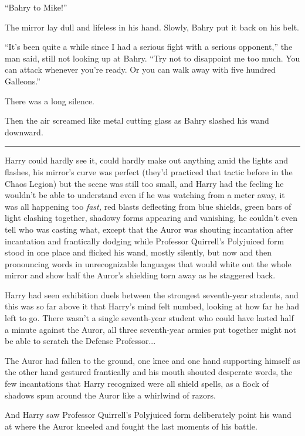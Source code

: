 ``Bahry to Mike!''

The mirror lay dull and lifeless in his hand. Slowly, Bahry put it back
on his belt.

``It's been quite a while since I had a serious fight with a serious
opponent,'' the man said, still not looking up at Bahry. ``Try not to
disappoint me too much. You can attack whenever you're ready. Or you can
walk away with five hundred Galleons.''

There was a long silence.

Then the air screamed like metal cutting glass as Bahry slashed his wand
downward.

\begin{center}\rule{3in}{0.4pt}\end{center}

Harry could hardly see it, could hardly make out anything amid the
lights and flashes, his mirror's curve was perfect (they'd practiced
that tactic before in the Chaos Legion) but the scene was still too
small, and Harry had the feeling he wouldn't be able to understand even
if he was watching from a meter away, it was all happening too
\emph{fast,} red blasts deflecting from blue shields, green bars of
light clashing together, shadowy forms appearing and vanishing, he
couldn't even tell who was casting what, except that the Auror was
shouting incantation after incantation and frantically dodging while
Professor Quirrell's Polyjuiced form stood in one place and flicked his
wand, mostly silently, but now and then pronouncing words in
unrecognizable languages that would white out the whole mirror and show
half the Auror's shielding torn away as he staggered back.

Harry had seen exhibition duels between the strongest seventh-year
students, and this was so far above it that Harry's mind felt numbed,
looking at how far he had left to go. There wasn't a single seventh-year
student who could have lasted half a minute against the Auror, all three
seventh-year armies put together might not be able to scratch the
Defense Professor...

The Auror had fallen to the ground, one knee and one hand supporting
himself as the other hand gestured frantically and his mouth shouted
desperate words, the few incantations that Harry recognized were all
shield spells, as a flock of shadows spun around the Auror like a
whirlwind of razors.

And Harry saw Professor Quirrell's Polyjuiced form deliberately point
his wand at where the Auror kneeled and fought the last moments of his
battle.

